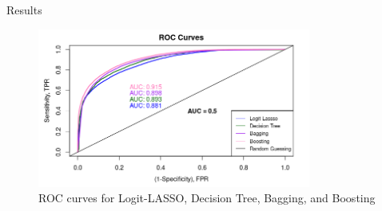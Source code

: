 \documentclass[10pt]{beamer}
\begin{document}
\begin{frame}[t]{Results}\justifying \vspace{1pt}
	\begin{figure}[htp]
		\centering
		\includegraphics[width=0.8\textwidth]{./MemoCurve.png}
		\caption{ROC curves for Logit-LASSO, Decision Tree, Bagging, and Boosting}
		\label{fig:picture1}
	\end{figure}
\end{frame}
\end{document}
